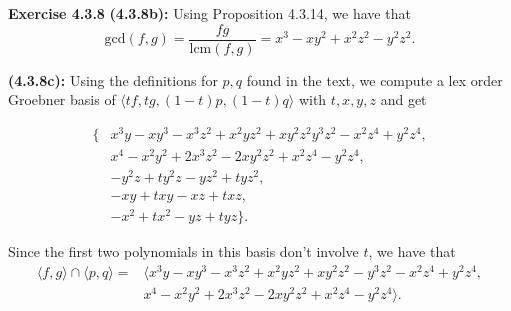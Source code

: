 \documentclass[12pt,oneside]{article}
\newenvironment{exercise}[1]{\vspace{.1in}\noindent\textbf{Exercise #1 \hspace{.05em}}}{}
\begin{document}
\begin{exercise}{4.3.8}
    \bigskip
    \textbf{(4.3.8b):}
        Using Proposition 4.3.14, we have that 
        \[
            \text{gcd}(f,g) = \frac{fg}{\text{lcm}(f,g)} = x^3-xy^2+x^2z^2-y^2z^2.
        \]
        
    \bigskip
    \textbf{(4.3.8c):}
    Using the definitions for $p,q$ found in the text, we compute a lex order Groebner basis
    of $\langle tf,tg,(1-t)p,(1-t)q \rangle$ with $t,x,y,z$ and get
    
    \begin{align*}
    \{&x^3 y - x y^3 - x^3 z^2 + x^2 y z^2 + x y^2 z^2 y^3 z^2 - x^2 z^4 + y^2 z^4,\\&x^4 - x^2 y^2 + 2 x^3 z^2 - 2 x y^2 z^2 + x^2 z^4 - y^2 z^4,\\&-y^2 z + t y^2 z - y z^2 + t y z^2,\\&-x y + t x y - x z + t x z,\\&-x^2 + t x^2 - y z + t y z\}. 
    \end{align*}
    
    Since the first two polynomials in this basis don't involve $t$, we have that 
    \begin{align*}
        \langle f,g \rangle \cap \langle p,q \rangle = &\langle x^3y-xy^3-x^3z^2+x^2yz^2+xy^2z^2-y^3z^2-x^2z^4+y^2z^4,\\&x^4-x^2y^2+2x^3z^2-2xy^2z^2+x^2z^4-y^2z^4 \rangle.
    \end{align*}
\end{exercise}


\end{document}
